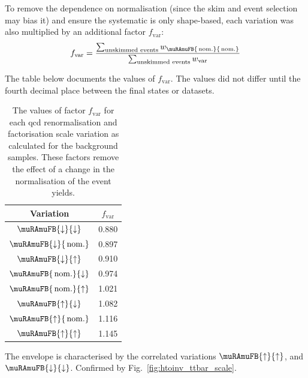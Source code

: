 \medskip

\noindent{}To remove the dependence on normalisation (since the skim and event selection may bias it) and ensure the systematic is only shape-based, each variation was also multiplied by an additional factor $f_{\mathrm{var}}$:
\begin{equation}
    f_{\mathrm{var}} = \dfrac{ \sum_{\text{unskimmed events}} w_{\muRAmuFB{\, \mathrm{nom.}}{\, \mathrm{nom.}}} }{ \sum_{\text{unskimmed events}} w_{\mathrm{var}} }
    \label{eq:ttbar_scale_fvar}
\end{equation}

The table below documents the values of $f_{\mathrm{var}}$. The values did not differ until the fourth decimal place between the final states or datasets.

\begin{table}[htbp]
    \centering
    \begin{tabular}{cc}
    \hline
    Variation & $f_{\mathrm{var}}$ \\ \hline
    $\muRAmuFB{\downarrow}{\downarrow}$ & 0.880\\
    $\muRAmuFB{\downarrow}{\, \mathrm{nom.}}$ & 0.897\\
    $\muRAmuFB{\downarrow}{ \uparrow}$ & 0.910\\
    $\muRAmuFB{\, \mathrm{nom.}}{\downarrow}$ & 0.974\\
    $\muRAmuFB{\, \mathrm{nom.}}{ \uparrow}$ & 1.021\\
    $\muRAmuFB{\uparrow}{\downarrow}$ & 1.082\\
    $\muRAmuFB{\uparrow}{\, \mathrm{nom.}}$ & 1.116\\
    $\muRAmuFB{\uparrow}{\uparrow}$ & 1.145\\
    \hline
    \end{tabular}
    \caption{The values of factor $f_{\mathrm{var}}$ for each \acrshort{qcd} renormalisation and factorisation scale variation as calculated for the \ttbar background samples. These factors remove the effect of a change in the normalisation of the event yields.}
    \label{tab:f_var_ttbar_scale}
\end{table}

The envelope is characterised by the correlated variations $\muRAmuFB{\uparrow}{\uparrow}$, and $\muRAmuFB{\downarrow}{\downarrow}$. Confirmed by Fig.~\ref{fig:htoinv_ttbar_scale}.

